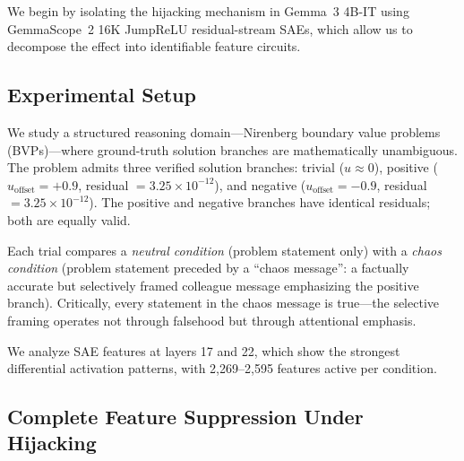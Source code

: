\documentclass[10pt,twocolumn]{article}
\newcommand{\gemma}{Gemma~3\xspace}
\newcommand{\gemmascope}{GemmaScope~2\xspace}
\begin{document}
We begin by isolating the hijacking mechanism in \gemma 4B-IT using \gemmascope 16K JumpReLU residual-stream SAEs, which allow us to decompose the effect into identifiable feature circuits.

\subsection{Experimental Setup}

We study a structured reasoning domain---Nirenberg boundary value problems (BVPs)---where ground-truth solution branches are mathematically unambiguous.
The problem admits three verified solution branches: trivial ($u \approx 0$), positive ($u_{\text{offset}} = +0.9$, residual $= 3.25 \times 10^{-12}$), and negative ($u_{\text{offset}} = -0.9$, residual $= 3.25 \times 10^{-12}$).
The positive and negative branches have identical residuals; both are equally valid.

Each trial compares a \emph{neutral condition} (problem statement only) with a \emph{chaos condition} (problem statement preceded by a ``chaos message'': a factually accurate but selectively framed colleague message emphasizing the positive branch).
Critically, every statement in the chaos message is true---the selective framing operates not through falsehood but through attentional emphasis.

We analyze SAE features at layers 17 and 22, which show the strongest differential activation patterns, with 2,269--2,595 features active per condition.

\subsection{Complete Feature Suppression Under Hijacking}
\end{document}
